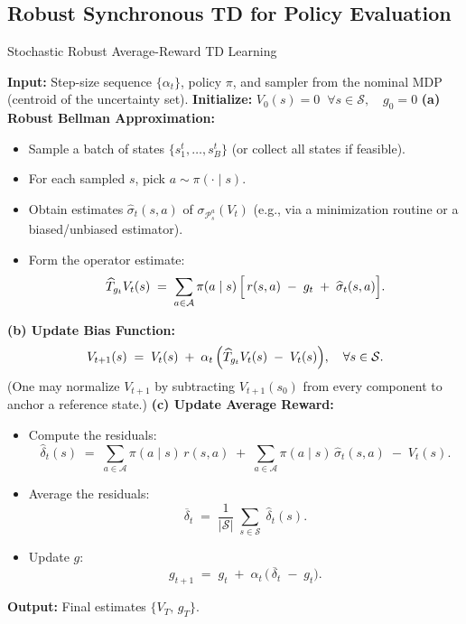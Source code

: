 \subsection{Robust Synchronous TD for Policy Evaluation}


\begin{algorithm}[ht]
\caption{Stochastic Robust Average-Reward TD Learning}
\label{alg:robust-avg-reward-TD}
\begin{algorithmic}[1]
\STATE \textbf{Input:} Step-size sequence \(\{\alpha_t\}\), policy \(\pi\), and sampler from the nominal MDP (centroid of the uncertainty set).
\STATE \textbf{Initialize:} \(V_0(s) = 0 \;\;\forall s\in\mathcal{S},\quad g_0 = 0\)
  \STATE \textbf{(a) Robust Bellman Approximation:}
    \begin{itemize}
      \item Sample a batch of states \(\{s^t_1,\dots,s^t_B\}\) (or collect all states if feasible).
      \item For each sampled \(s\), pick \(a\sim\pi(\cdot\mid s)\).
      \item Obtain estimates \(\widehat{\sigma}_t(s,a)\) of \(\sigma_{\mathcal{P}^a_s}(V_t)\)
            (e.g., via a minimization routine or a biased/unbiased estimator).
      \item Form the operator estimate:
            \[
               \widehat{T}_{g_t}V_t(s) \;=\; \sum_{a\in\mathcal{A}} \pi(a\mid s)\,
               \Bigl[\,
                   r(s,a) \;-\; g_t \;+\; \widehat{\sigma}_t(s,a)
               \Bigr].
            \]
    \end{itemize}
  \STATE \textbf{(b) Update Bias Function:}
    \[
       V_{t+1}(s)
       \;=\;
       V_t(s)
       \;+\;
       \alpha_t\,\Bigl(\widehat{T}_{g_t}V_t(s) \;-\; V_t(s)\Bigr),
       \quad \forall s\in \mathcal{S}.
    \]
    \STATE \quad (One may normalize \(V_{t+1}\) by subtracting \(V_{t+1}(s_0)\) from every component to anchor a reference state.)
  \STATE \textbf{(c) Update Average Reward:}
    \begin{itemize}
      \item Compute the residuals:
            \[
              \widehat{\delta}_t(s)
              \;=\;
              \sum_{a\in\mathcal{A}} \pi(a\mid s)\,r(s,a)
              \;+\;
              \sum_{a\in\mathcal{A}} \pi(a\mid s)\,\widehat{\sigma}_t(s,a)
              \;-\;
              V_t(s).
            \]
      \item Average the residuals:
            \[
               \overline{\delta}_t
               \;=\;
               \frac{1}{|\mathcal{S}|}\;\sum_{s\in\mathcal{S}}\;\widehat{\delta}_t(s).
            \]
      \item Update \(g\):
            \[
               g_{t+1}
               \;=\;
               g_t
               \;+\;
               \alpha_t\,\bigl(\,\overline{\delta}_t \;-\; g_t\bigr).
            \]
    \end{itemize}
\ENDFOR
\STATE \textbf{Output:} Final estimates \(\{V_T,\,g_T\}\).
\end{algorithmic}
\end{algorithm}

